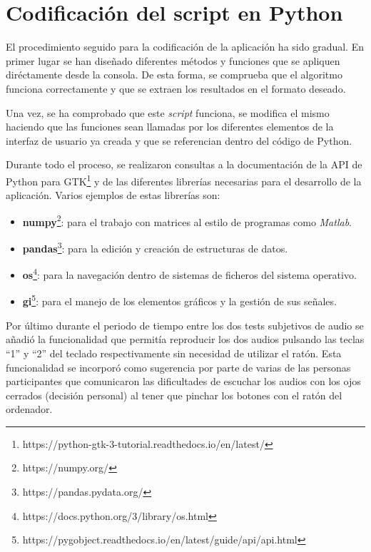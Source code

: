 \documentclass[11pt,a4paper]{book}
\begin{document}
        \section{Codificación del script en Python}            
            El procedimiento seguido para la codificación de la aplicación ha sido gradual. En primer lugar se han diseñado diferentes métodos y funciones que se apliquen diréctamente desde la consola. De esta forma, se comprueba que el algoritmo funciona correctamente y que se extraen los resultados en el formato deseado.
            
            Una vez, se ha comprobado que este \textit{script} funciona, se modifica el mismo haciendo que las funciones sean llamadas por los diferentes elementos de la interfaz de usuario ya creada y que se referencian dentro del código de Python.
            
            Durante todo el proceso, se realizaron consultas a la documentación de la API de Python para GTK\footnote{https://python-gtk-3-tutorial.readthedocs.io/en/latest/} y de las diferentes librerías necesarias para el desarrollo de la aplicación. Varios ejemplos de estas librerías son:
            \begin{itemize}
                \item \textbf{numpy}\footnote{https://numpy.org/}: para el trabajo con matrices al estilo de programas como \textit{Matlab}.
                \item \textbf{pandas}\footnote{https://pandas.pydata.org/}: para la edición y creación de estructuras de datos.
                \item \textbf{os}\footnote{https://docs.python.org/3/library/os.html}: para la navegación dentro de sistemas de ficheros del sistema operativo.
                \item \textbf{gi}\footnote{https://pygobject.readthedocs.io/en/latest/guide/api/api.html}: para el manejo de los elementos gráficos y la gestión de sus señales.
            \end{itemize}
            
            Por último durante el periodo de tiempo entre los dos tests subjetivos de audio se añadió la funcionalidad que permitía reproducir los dos audios pulsando las teclas ``1'' y ``2'' del teclado respectivamente sin necesidad de utilizar el ratón. Esta funcionalidad se incorporó como sugerencia por parte de varias de las personas participantes que comunicaron las dificultades de escuchar los audios con los ojos cerrados (decisión personal) al tener que pinchar los botones con el ratón del ordenador.
            
\end{document}
